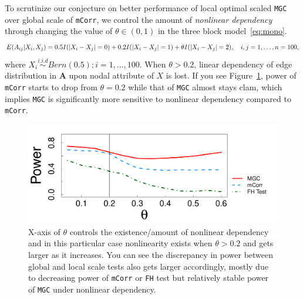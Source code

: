 \documentclass[11pt]{article}
\theoremstyle{definition}
\begin{document}
To scrutinize our conjecture on better performance of local optimal scaled \texttt{MGC} over global scale of \texttt{mCorr}, we control the amount of \textit{nonlinear dependency} through changing the value of $\theta \in (0, 1)$ in the three block model~\ref{eq:mono}. 
\begin{equation}
E(A_{ij} | X_{i}, X_{j}) = 0.5 I(|X_{i} - X_{j}| = 0) + 0.2 I(|X_{i} - X_{j}| = 1) + \theta I(|X_{i} - X_{j}| = 2), \quad i,j = 1, \ldots, n = 100, 
\label{eq:mono}
\vspace*{-0.4cm}
\end{equation}
where  $X_{i} \overset{i.i.d}{\sim} Bern(0.5); i =1, \ldots, 100$. When $\theta > 0.2$, linear dependency of edge distribution in $\mathbf{A}$ upon nodal attribute of $X$ is lost. If you see Figure~\ref{fig:powerplot}, power of \texttt{mCorr} starts to drop from $\theta = 0.2$ while that of \texttt{MGC} almost stays clam, which implies \texttt{MGC} is significantly more sensitive to nonlinear dependency compared to \texttt{mCorr}.  
\begin{figure}[ht]
	\centering
	\includegraphics[width=0.7\linewidth]{../Figure/mono_simple.pdf}
	\caption{X-axis of $\theta$ controls the existence/amount of nonlinear dependency and in this particular case nonlinearity exists when $\theta > 0.2$ and gets larger as it increases. You can see the discrepancy in power between global and local scale tests also gets larger accordingly, mostly due to decreasing power of \texttt{mCorr} or \texttt{FH} test but relatively stable power of \texttt{MGC} under nonlinear dependency.}
	\label{fig:powerplot}
\end{figure}
\end{document}
